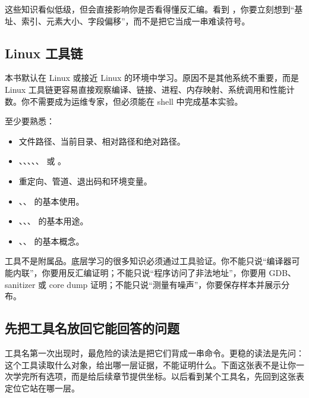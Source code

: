 这些知识看似低级，但会直接影响你是否看得懂反汇编。看到 ，你要立刻想到“基址、索引、元素大小、字段偏移”，而不是把它当成一串难读符号。

\subsection{Linux 工具链}

本书默认在 Linux 或接近 Linux 的环境中学习。原因不是其他系统不重要，而是 Linux 工具链更容易直接观察编译、链接、进程、内存映射、系统调用和性能计数。你不需要成为运维专家，但必须能在 shell 中完成基本实验。

至少要熟悉：

\begin{itemize}
  \item 文件路径、当前目录、相对路径和绝对路径。
  \item {}、、、、、 或 。
  \item 重定向、管道、退出码和环境变量。
  \item {}、、 的基本使用。
  \item {}、、、 的基本用途。
  \item {}、、 的基本概念。
\end{itemize}

工具不是附属品。底层学习的很多知识必须通过工具验证。你不能只说“编译器可能内联”，你要用反汇编证明；不能只说“程序访问了非法地址”，你要用 GDB、sanitizer 或 core dump 证明；不能只说“测量有噪声”，你要保存样本并展示分布。

\subsection{先把工具名放回它能回答的问题}

工具名第一次出现时，最危险的读法是把它们背成一串命令。更稳的读法是先问：这个工具读取什么对象，给出哪一层证据，不能证明什么。下面这张表不是让你一次学完所有选项，而是给后续章节提供坐标。以后看到某个工具名，先回到这张表定位它站在哪一层。

